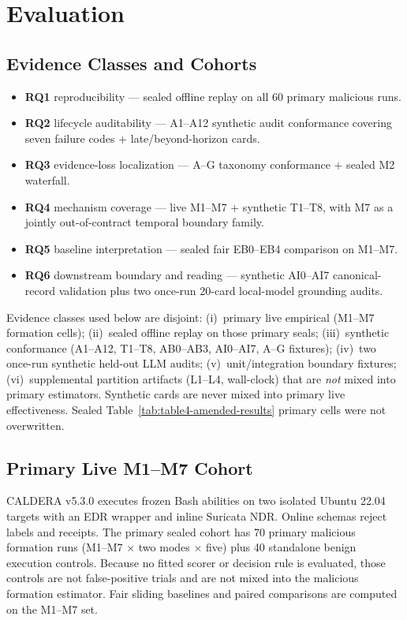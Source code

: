 \section{Evaluation}
\label{sec:evaluation}

\subsection{Evidence Classes and Cohorts}
\label{sec:research-questions}

\begin{itemize}
  \item \textbf{RQ1} reproducibility --- sealed offline replay on all 60 primary malicious runs.
  \item \textbf{RQ2} lifecycle auditability --- A1--A12 synthetic audit conformance covering
        seven failure codes + late/beyond-horizon cards.
  \item \textbf{RQ3} evidence-loss localization --- A--G taxonomy conformance + sealed M2 waterfall.
  \item \textbf{RQ4} mechanism coverage --- live M1--M7 + synthetic T1--T8, with M7 as a
        jointly out-of-contract temporal boundary family.
  \item \textbf{RQ5} baseline interpretation --- sealed fair EB0--EB4 comparison on M1--M7.
  \item \textbf{RQ6} downstream boundary and reading --- synthetic AI0--AI7 canonical-record
        validation plus two once-run 20-card local-model grounding audits.
\end{itemize}
Evidence classes used below are disjoint: (i)~primary live empirical (M1--M7 formation cells);
(ii)~sealed offline replay on those primary seals; (iii)~synthetic conformance (A1--A12, T1--T8,
AB0--AB3, AI0--AI7, A--G fixtures); (iv)~two once-run synthetic held-out LLM audits;
(v)~unit/integration boundary fixtures; (vi)~supplemental partition artifacts (L1--L4,
wall-clock) that are \emph{not} mixed into primary estimators.
Synthetic cards are never mixed into primary live effectiveness. Sealed
Table~\ref{tab:table4-amended-results} primary cells were not overwritten.

\subsection{Primary Live M1--M7 Cohort}
\label{sec:datasets}

CALDERA v5.3.0 executes frozen Bash abilities on two isolated Ubuntu 22.04 targets with an EDR
wrapper and inline Suricata NDR. Online schemas reject labels and receipts. The primary sealed
cohort has 70 primary malicious formation runs (M1--M7 $\times$ two modes $\times$ five) plus 40
standalone benign execution controls. Because no fitted scorer or decision rule is evaluated, those
controls are not false-positive trials and are not mixed into the malicious formation estimator.
Fair sliding baselines and paired comparisons are computed on the M1--M7 set.

